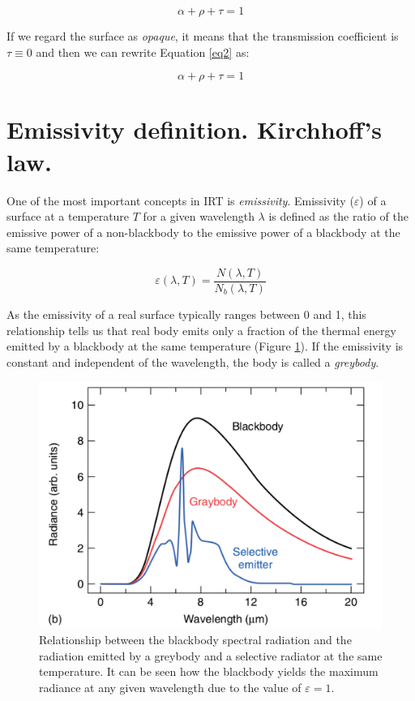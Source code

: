 		\begin{equation}\label{eq2}
			\alpha + \rho + \tau = 1
		\end{equation}
		
		If we regard the surface as \textit{opaque}, it means that the transmission coefficient is $\tau \equiv 0$ and then we can rewrite Equation \ref{eq2} as:	
		
		\begin{equation}\label{eq3}
			\alpha + \rho + \tau = 1
		\end{equation}
		
	\section{Emissivity definition. Kirchhoff's law.}\label{section1.3}
		
		One of the most important concepts in IRT is \textit{emissivity}. Emissivity ($\varepsilon$) of a surface at a temperature $T$ for a given wavelength $\lambda$ is defined as the ratio of the emissive power of a  non-blackbody to the emissive power of a blackbody at the same temperature:
		
		\begin{equation}\label{eq4}
			\varepsilon(\lambda,T)=\frac{N(\lambda,T)}{N_{b}(\lambda,T)}
		\end{equation}
		
		As the emissivity of a real surface typically ranges between 0 and 1, this relationship tells us that real body emits only a fraction of the thermal energy emitted by a blackbody at the same temperature (Figure \ref{fig4}). If the emissivity is constant and independent of the wavelength, the body is called a \textit{greybody}.
		
		\begin{figure}[ht!]
			\centering
			\captionsetup{justification=centering,margin=2cm}
			\includegraphics[scale=0.45]{Figures/Chapter01/BlackAndGreybodyComparison.pdf}
			\caption{Relationship between the blackbody spectral radiation and the radiation emitted by a greybody and a selective radiator at the same temperature. It can be seen how the blackbody yields the maximum radiance at any given wavelength due to the value of $\varepsilon=1$.}\label{fig4}
		\end{figure}
		
